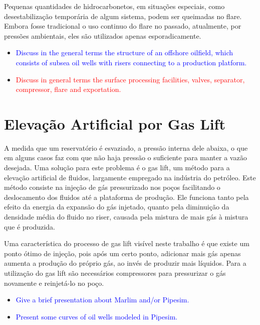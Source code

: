 Pequenas quantidades de hidrocarbonetos, em situações especiais, como desestabilização temporária de algum sistema, podem ser queimadas no flare. Embora fosse tradicional o uso continuo do flare no passado, atualmente, por pressões ambientais, eles são utilizados apenas esporadicamente.

\begin{itemize}

\item \textcolor{blue}{Discuss in the general terms the structure of an offshore oilfield, which consists of subsea oil wells with risers connecting to a production platform.}


\item \textcolor{red}{Discuss in general terms the surface processing facilities, valves, separator, compressor, flare and exportation.}

\end{itemize}



\section{Elevação Artificial por Gas Lift}

A medida que um reservatório é esvaziado, a pressão interna dele abaixa, o que em alguns casos faz com que não haja pressão o suficiente para manter a vazão desejada.
%
Uma solução para este problema é o gas lift, um método para a elevação artificial de fluidos, largamente empregado na indústria do petróleo.
%
Este método consiste na injeção de gás pressurizado nos poços facilitando o deslocamento dos fluidos até a plataforma de produção. 
%
Ele funciona tanto pela efeito da energia da expansão do gás injetado, quanto pela diminuição da densidade média do fluido no riser, causada pela mistura de mais gás à mistura que é produzida.
%


Uma característica do processo de gas lift visível neste trabalho é que existe um ponto ótimo de injeção, pois após um certo ponto, adicionar mais gás apenas aumenta a produção do próprio gás, ao invés de produzir mais líquidos.
%
Para a utilização do gas lift são necessários compressores para pressurizar o gás novamente e reinjetá-lo no poço.




\begin{itemize}

\item \textcolor{blue}{Give a brief presentation about Marlim and/or Pipesim.}

\item \textcolor{blue}{Present some curves of oil wells modeled in Pipesim.}


\end{itemize}
